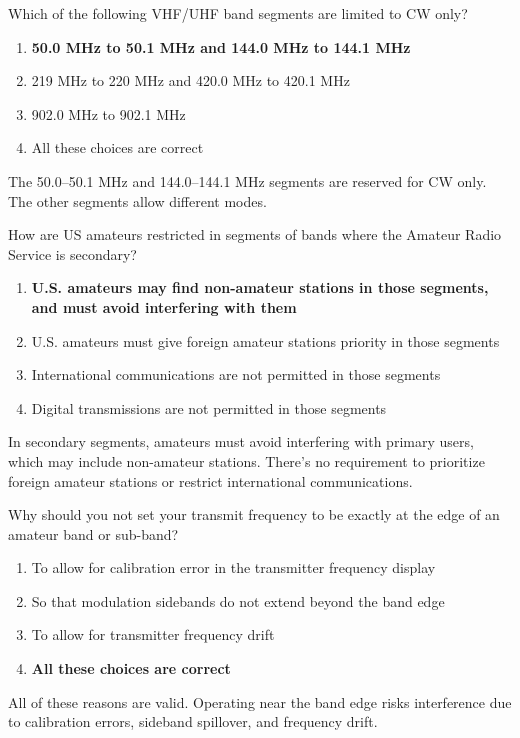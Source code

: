 \begin{tcolorbox}[colback=gray!10!white,colframe=black!75!black,title={T1B07}]
    Which of the following VHF/UHF band segments are limited to CW only?
    \begin{enumerate}[label=\Alph*),noitemsep]
        \item \textbf{50.0 MHz to 50.1 MHz and 144.0 MHz to 144.1 MHz}
        \item 219 MHz to 220 MHz and 420.0 MHz to 420.1 MHz
        \item 902.0 MHz to 902.1 MHz
        \item All these choices are correct
    \end{enumerate}
\end{tcolorbox}
The 50.0–50.1 MHz and 144.0–144.1 MHz segments are reserved for CW only. The other segments allow different modes.

\begin{tcolorbox}[colback=gray!10!white,colframe=black!75!black,title={T1B08}]
    How are US amateurs restricted in segments of bands where the Amateur Radio Service is secondary?
    \begin{enumerate}[label=\Alph*),noitemsep]
        \item \textbf{U.S. amateurs may find non-amateur stations in those segments, and must avoid interfering with them}
        \item U.S. amateurs must give foreign amateur stations priority in those segments
        \item International communications are not permitted in those segments
        \item Digital transmissions are not permitted in those segments
    \end{enumerate}
\end{tcolorbox}
In secondary segments, amateurs must avoid interfering with primary users, which may include non-amateur stations. There’s no requirement to prioritize foreign amateur stations or restrict international communications.

\begin{tcolorbox}[colback=gray!10!white,colframe=black!75!black,title={T1B09}]
    Why should you not set your transmit frequency to be exactly at the edge of an amateur band or sub-band?
    \begin{enumerate}[label=\Alph*),noitemsep]
        \item To allow for calibration error in the transmitter frequency display
        \item So that modulation sidebands do not extend beyond the band edge
        \item To allow for transmitter frequency drift
        \item \textbf{All these choices are correct}
    \end{enumerate}
\end{tcolorbox}
All of these reasons are valid. Operating near the band edge risks interference due to calibration errors, sideband spillover, and frequency drift.

